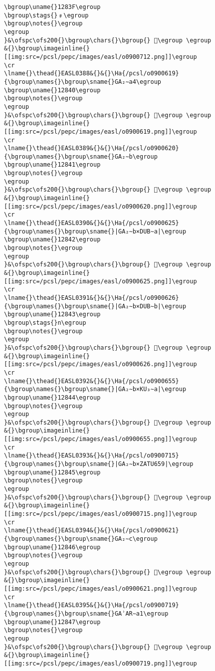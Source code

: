 \begin{verbatim}
\bgroup\uname{}1283F\egroup
\bgroup\stags{}﹟\egroup
\bgroup\notes{}\egroup
\egroup
}&\ofspc\ofs200{}\bgroup\chars{}\bgroup{} 𒠿\egroup \egroup
&{}\bgroup\imageinline{}[[img:src=/pcsl/pepc/images/easl/o0900712.png]]\egroup
\cr
\lname{}\thead{}EASL0388&{}&{}\Ha{/pcsl/o0900619}{\bgroup\names{}\bgroup\sname{}GA₂∼a4\egroup
\bgroup\uname{}12840\egroup
\bgroup\notes{}\egroup
\egroup
}&\ofspc\ofs200{}\bgroup\chars{}\bgroup{} 𒡀\egroup \egroup
&{}\bgroup\imageinline{}[[img:src=/pcsl/pepc/images/easl/o0900619.png]]\egroup
\cr
\lname{}\thead{}EASL0389&{}&{}\Ha{/pcsl/o0900620}{\bgroup\names{}\bgroup\sname{}GA₂∼b\egroup
\bgroup\uname{}12841\egroup
\bgroup\notes{}\egroup
\egroup
}&\ofspc\ofs200{}\bgroup\chars{}\bgroup{} 𒡁\egroup \egroup
&{}\bgroup\imageinline{}[[img:src=/pcsl/pepc/images/easl/o0900620.png]]\egroup
\cr
\lname{}\thead{}EASL0390&{}&{}\Ha{/pcsl/o0900625}{\bgroup\names{}\bgroup\sname{}|GA₂∼b×DUB∼a|\egroup
\bgroup\uname{}12842\egroup
\bgroup\notes{}\egroup
\egroup
}&\ofspc\ofs200{}\bgroup\chars{}\bgroup{} 𒡂\egroup \egroup
&{}\bgroup\imageinline{}[[img:src=/pcsl/pepc/images/easl/o0900625.png]]\egroup
\cr
\lname{}\thead{}EASL0391&{}&{}\Ha{/pcsl/o0900626}{\bgroup\names{}\bgroup\sname{}|GA₂∼b×DUB∼b|\egroup
\bgroup\uname{}12843\egroup
\bgroup\stags{}n\egroup
\bgroup\notes{}\egroup
\egroup
}&\ofspc\ofs200{}\bgroup\chars{}\bgroup{} 𒡃\egroup \egroup
&{}\bgroup\imageinline{}[[img:src=/pcsl/pepc/images/easl/o0900626.png]]\egroup
\cr
\lname{}\thead{}EASL0392&{}&{}\Ha{/pcsl/o0900655}{\bgroup\names{}\bgroup\sname{}|GA₂∼b×KU₃∼a|\egroup
\bgroup\uname{}12844\egroup
\bgroup\notes{}\egroup
\egroup
}&\ofspc\ofs200{}\bgroup\chars{}\bgroup{} 𒡄\egroup \egroup
&{}\bgroup\imageinline{}[[img:src=/pcsl/pepc/images/easl/o0900655.png]]\egroup
\cr
\lname{}\thead{}EASL0393&{}&{}\Ha{/pcsl/o0900715}{\bgroup\names{}\bgroup\sname{}|GA₂∼b×ZATU659|\egroup
\bgroup\uname{}12845\egroup
\bgroup\notes{}\egroup
\egroup
}&\ofspc\ofs200{}\bgroup\chars{}\bgroup{} 𒡅\egroup \egroup
&{}\bgroup\imageinline{}[[img:src=/pcsl/pepc/images/easl/o0900715.png]]\egroup
\cr
\lname{}\thead{}EASL0394&{}&{}\Ha{/pcsl/o0900621}{\bgroup\names{}\bgroup\sname{}GA₂∼c\egroup
\bgroup\uname{}12846\egroup
\bgroup\notes{}\egroup
\egroup
}&\ofspc\ofs200{}\bgroup\chars{}\bgroup{} 𒡆\egroup \egroup
&{}\bgroup\imageinline{}[[img:src=/pcsl/pepc/images/easl/o0900621.png]]\egroup
\cr
\lname{}\thead{}EASL0395&{}&{}\Ha{/pcsl/o0900719}{\bgroup\names{}\bgroup\sname{}GAʾAR∼a1\egroup
\bgroup\uname{}12847\egroup
\bgroup\notes{}\egroup
\egroup
}&\ofspc\ofs200{}\bgroup\chars{}\bgroup{} 𒡇\egroup \egroup
&{}\bgroup\imageinline{}[[img:src=/pcsl/pepc/images/easl/o0900719.png]]\egroup

\end{verbatim}

